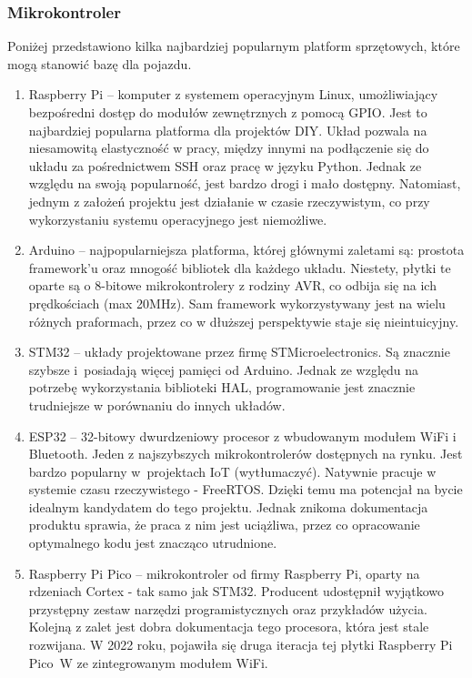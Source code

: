         \subsubsection{Mikrokontroler}
            Poniżej przedstawiono kilka najbardziej popularnym platform sprzętowych, które mogą stanowić bazę dla pojazdu.
            \begin{enumerate}
                \item Raspberry Pi -- komputer z systemem operacyjnym Linux, umożliwiający bezpośredni dostęp do modułów zewnętrznych z pomocą GPIO.
                Jest to najbardziej popularna platforma dla projektów DIY.
                Układ pozwala na niesamowitą elastyczność w pracy, między innymi na podłączenie się do układu za pośrednictwem SSH oraz pracę w języku Python.
                Jednak ze względu na swoją popularność, jest bardzo drogi i mało dostępny.
                Natomiast, jednym z założeń projektu jest działanie w czasie rzeczywistym, co przy wykorzystaniu systemu operacyjnego jest niemożliwe.
                \item Arduino -- najpopularniejsza platforma, której głównymi zaletami są: prostota framework'u oraz mnogość bibliotek dla każdego układu.
                Niestety, płytki te oparte są o 8-bitowe mikrokontrolery z rodziny AVR, co odbija się na ich prędkościach  (max 20MHz).
                Sam framework wykorzystywany jest na wielu różnych praformach, przez co w dłuższej perspektywie staje się nieintuicyjny.
                \item STM32 -- układy projektowane przez firmę STMicroelectronics. Są znacznie szybsze i~posiadają więcej pamięci od Arduino.
                Jednak ze względu na potrzebę wykorzystania biblioteki HAL, programowanie jest znacznie trudniejsze w porównaniu do innych układów.
                \item ESP32 -- 32-bitowy dwurdzeniowy procesor z wbudowanym modułem WiFi i Bluetooth.
                Jeden z najszybszych mikrokontrolerów dostępnych na rynku. Jest bardzo popularny w~projektach IoT (wytłumaczyć).
                Natywnie pracuje w systemie czasu rzeczywistego - FreeRTOS. Dzięki temu ma potencjał na bycie idealnym kandydatem do tego projektu.
                Jednak znikoma dokumentacja produktu sprawia, że praca z nim jest uciążliwa, przez co opracowanie optymalnego kodu jest znacząco utrudnione.
                \item Raspberry Pi Pico -- mikrokontroler od firmy Raspberry Pi, oparty na rdzeniach Cortex - tak samo jak STM32.
                Producent udostępnił wyjątkowo przystępny zestaw narzędzi programistycznych oraz przykładów użycia.
                Kolejną z zalet jest dobra dokumentacja tego procesora, która jest stale rozwijana.
                W 2022 roku, pojawiła się druga iteracja tej płytki Raspberry Pi Pico~W ze zintegrowanym modułem WiFi.
            \end{enumerate}
